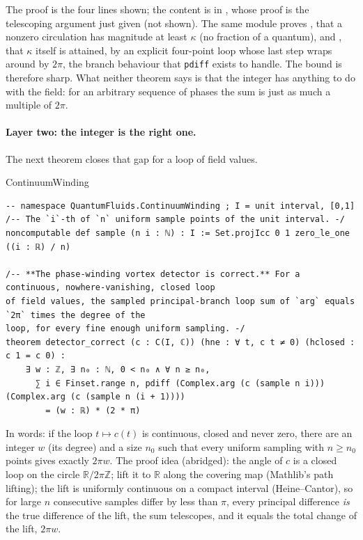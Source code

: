 The proof is the four lines shown; the content is in , whose proof is the telescoping argument just given (not shown). The same module proves , that a nonzero circulation has magnitude at least $\kappa$ (no fraction of a quantum), and , that $\kappa$ itself is attained, by an explicit four-point loop whose last step wraps around by $2\pi$, the branch behaviour that \texttt{pdiff} exists to handle. The bound is therefore sharp. What neither theorem says is that the integer has anything to do with the field: for an arbitrary sequence of phases the sum is just as much a multiple of $2\pi$.

\paragraph{Layer two: the integer is the right one.} The next theorem closes that gap for a loop of field values.

\begin{leanbox}{ContinuumWinding}
\begin{lstlisting}[style=lean,basicstyle=\ttfamily\footnotesize]
-- namespace QuantumFluids.ContinuumWinding ; I = unit interval, [0,1]
/-- The `i`-th of `n` uniform sample points of the unit interval. -/
noncomputable def sample (n i : ℕ) : I := Set.projIcc 0 1 zero_le_one ((i : ℝ) / n)

/-- **The phase-winding vortex detector is correct.** For a continuous, nowhere-vanishing, closed loop
of field values, the sampled principal-branch loop sum of `arg` equals `2π` times the degree of the
loop, for every fine enough uniform sampling. -/
theorem detector_correct (c : C(I, ℂ)) (hne : ∀ t, c t ≠ 0) (hclosed : c 1 = c 0) :
    ∃ w : ℤ, ∃ n₀ : ℕ, 0 < n₀ ∧ ∀ n ≥ n₀,
      ∑ i ∈ Finset.range n, pdiff (Complex.arg (c (sample n i))) (Complex.arg (c (sample n (i + 1))))
        = (w : ℝ) * (2 * π)
\end{lstlisting}
\end{leanbox}

In words: if the loop $t\mapsto c(t)$ is continuous, closed and never zero, there are an integer $w$ (its degree) and a size $n_0$ such that every uniform sampling with $n\ge n_0$ points gives exactly $2\pi w$. The proof idea (abridged): the angle of $c$ is a closed loop on the circle $\mathbb R/2\pi\mathbb Z$; lift it to $\mathbb R$ along the covering map (Mathlib's path lifting); the lift is uniformly continuous on a compact interval (Heine--Cantor), so for large $n$ consecutive samples differ by less than $\pi$, every principal difference \emph{is} the true difference of the lift, the sum telescopes, and it equals the total change of the lift, $2\pi w$.

